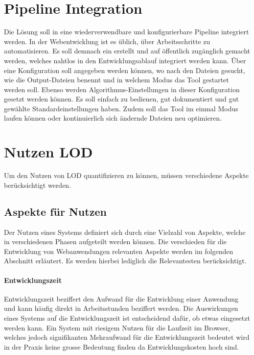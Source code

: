 \section{Pipeline Integration}
Die Lösung soll in eine wiederverwendbare und konfigurierbare Pipeline integriert werden.
In der Webentwicklung ist es üblich, über  Arbeitsschritte zu automatisieren. Es soll demnach ein  erstellt und auf  öffentlich zugänglich gemacht werden, welches nahtlos in den Entwicklungsablauf integriert werden kann. Über eine Konfiguration soll angegeben werden können, wo nach den  Dateien gesucht, wie die Output-Dateien benennt und in welchem Modus das Tool gestartet werden soll. Ebenso werden Algorithmus-Einstellungen in dieser Konfiguration gesetzt werden können. Es soll einfach zu bedienen, gut dokumentiert und gut gewählte Standardeinstellungen haben. Zudem soll das Tool im einmal Modus laufen können oder kontinuierlich sich ändernde Dateien neu optimieren.

\section{Nutzen LOD}
Um den Nutzen von LOD quantifizieren zu können, müssen verschiedene Aspekte berücksichtigt werden.

\subsection{Aspekte für Nutzen}

Der Nutzen eines Systems definiert sich durch eine Vielzahl von Aspekte, welche in verschiedenen Phasen aufgeteilt werden können. Die verschieden für die Entwicklung von Webanwendungen relevanten Aspekte werden im folgenden Abschnitt erläutert. Es werden hierbei lediglich die Relevantesten berücksichtigt.

\paragraph{Entwicklungszeit}

Entwicklungszeit beziffert den Aufwand für die Entwicklung einer Anwendung und kann häufig direkt in Arbeitsstunden beziffert werden.
Die Auswirkungen eines Systems auf die Entwicklungszeit ist entscheidend dafür, ob etwas eingesetzt werden kann. Ein System mit riesigem Nutzen für die Laufzeit im Browser, welches jedoch signifikanten Mehraufwand für die Entwicklungszeit bedeutet wird in der Praxis keine grosse Bedeutung finden da Entwicklungskosten hoch sind.

